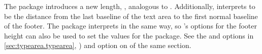 \begin{Declaration}
\end{Declaration}
The  package introduces a new length, ,
analogous to %
.
Additionally,
interprets  to be the distance from the last baseline of the
text area to the first normal baseline of the footer. The
\hyperref[cha:typearea]{}%
 package interprets
 in the same way, so 's options for the
footer height can also be used to set the values for the 
package. See the  and 
 options in
\autoref{sec:typearea.typearea}, )
and option  on
 of the same section.

